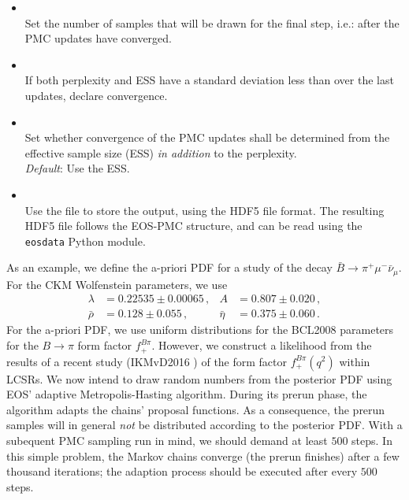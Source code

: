 \begin{itemize}
    \item[] \\[\medskipamount]
        Set the number  of samples that will be drawn for the final step,
        i.e.: after the PMC updates have converged.

    \item[] \\[\medskipamount]
        If both perplexity and ESS have a standard deviation less than  over the
        last  updates, declare convergence.

    \item[] \\[\medskipamount]
        Set whether convergence of the PMC updates shall be determined from the
        effective sample size (ESS) \emph{in addition} to the perplexity.\\
        \emph{Default}: Use the ESS.

    \item[] \\[\medskipamount]
        Use the file  to store the output, using the \gls{HDF5}
        file format.  The resulting \gls{HDF5} file follows the EOS-\gls{PMC}
        structure, and can be read using the \texttt{eosdata} Python
        module.
\end{itemize}

As an example, we define the a-priori \gls{PDF} for a study of the decay $\bar{B}\to \pi^+\mu^-\bar\nu_\mu$.
For the CKM Wolfenstein parameters, we use
\begin{equation*}
\begin{aligned}
    \lambda    & = 0.22535 \pm 0.00065\,,  &
    A          & = 0.807 \pm 0.020\,,      \\
    \bar{\rho} & = 0.128 \pm 0.055\,,      &
    \bar{\eta} & = 0.375 \pm 0.060\,.
\end{aligned}
\end{equation*}
For the a-priori \gls{PDF}, we use uniform distributions for the BCL2008
\cite{Bourrely:2008za} parameters for the $B\to \pi$ form factor $f^{B\pi}_+$.
However, we construct a likelihood from the results of a recent study
(IKMvD2016 \cite{Imsong:2014oqa}) of the form factor $f^{B\pi}_+(q^2)$ within \glspl{LCSR}.
We now intend to draw random numbers from the posterior PDF using EOS' adaptive
Metropolis-Hasting algorithm.  During its prerun phase, the algorithm adapts
the chains' proposal functions. As a consequence, the prerun samples will in
general \emph{not} be distributed according to the posterior \gls{PDF}. With a subequent
PMC sampling run in mind, we should demand at least $500$ steps. In this simple
problem, the Markov chains converge (the prerun finishes) after a few thousand iterations;
the adaption process should be executed after every $500$ steps.\\

